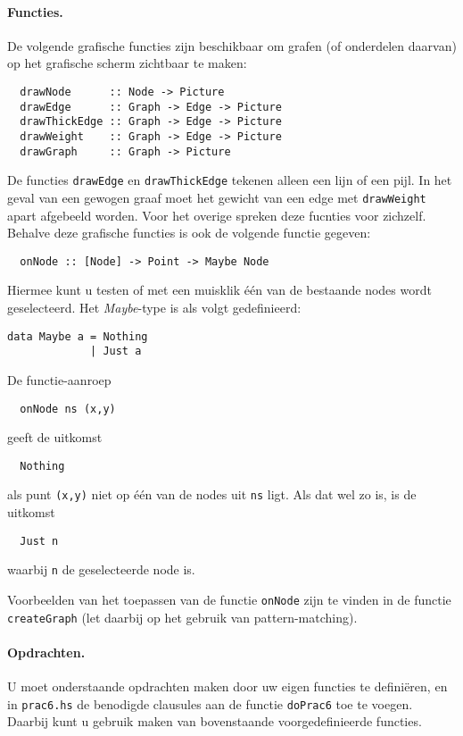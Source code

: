 \documentclass[11pt]{article}
\begin{document}
\paragraph{Functies.}
De volgende grafische functies zijn beschikbaar om grafen (of onderdelen
daarvan) op het grafische scherm zichtbaar te maken:
\begin{verbatim}
  drawNode      :: Node -> Picture
  drawEdge      :: Graph -> Edge -> Picture
  drawThickEdge :: Graph -> Edge -> Picture
  drawWeight    :: Graph -> Edge -> Picture
  drawGraph     :: Graph -> Picture
\end{verbatim}
De functies \verb!drawEdge! en \verb!drawThickEdge! tekenen alleen een
lijn of een pijl.
In het geval van een gewogen graaf moet het gewicht van een edge met
\verb!drawWeight! apart afgebeeld worden.
Voor het overige spreken deze fucnties voor zichzelf.
\\[2ex]
Behalve deze grafische functies is ook de volgende functie gegeven:
\begin{verbatim}
  onNode :: [Node] -> Point -> Maybe Node
\end{verbatim}
Hiermee kunt u testen of met een muisklik \'e\'en van de
bestaande nodes wordt geselecteerd.
Het \emph{Maybe}-type is als volgt gedefinieerd:
\begin{verbatim}
data Maybe a = Nothing
             | Just a
\end{verbatim}
De functie-aanroep
\begin{verbatim}
  onNode ns (x,y)
\end{verbatim}
geeft de uitkomst
\begin{verbatim}
  Nothing
\end{verbatim}
als punt \verb!(x,y)! niet op \'e\'en van de nodes uit \verb!ns! ligt.
Als dat wel zo is, is de uitkomst
\begin{verbatim}
  Just n
\end{verbatim}
waarbij \verb!n! de geselecteerde node is.

Voorbeelden van het toepassen van de functie \verb!onNode! zijn te vinden in
de functie \verb!createGraph!
(let daarbij op het gebruik van pattern-matching).

\paragraph{Opdrachten.}
U moet onderstaande opdrachten maken door uw eigen functies te defini\"eren,
en in \verb!prac6.hs!  de benodigde clausules aan de functie
\verb!doPrac6! toe te voegen.
Daarbij kunt u gebruik maken van bovenstaande voorgedefinieerde functies.
\end{document}
